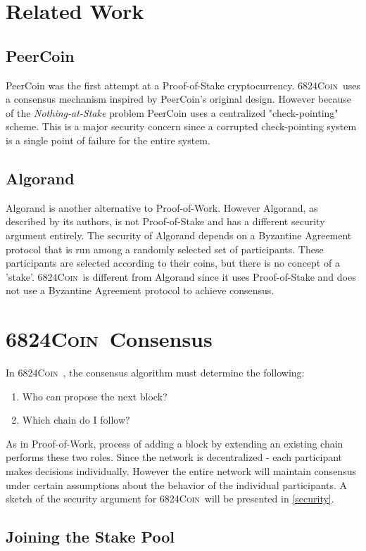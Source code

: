 \documentclass{article}
\newcommand{\coin}{ \textsc{6824Coin}\ }
\begin{document}
\section{Related Work}

\subsection{PeerCoin}
PeerCoin \cite{peercoin} was the first attempt at a Proof-of-Stake cryptocurrency. \coin uses a consensus mechanism inspired by PeerCoin's original design. However because of the \textit{Nothing-at-Stake} problem PeerCoin uses a centralized "check-pointing" scheme. This is a major security concern since a corrupted check-pointing system is a single point of failure for the entire system.  

\subsection{Algorand}
Algorand \cite{algorand} is another alternative to Proof-of-Work. However Algorand, as described by its authors, is not Proof-of-Stake and has a different security argument entirely. The security of Algorand depends on a Byzantine Agreement protocol that is run among a randomly selected set of participants. These participants are selected according to their coins, but there is no concept of a 'stake'. \coin is different from Algorand since it uses Proof-of-Stake and does not use a Byzantine Agreement protocol to achieve consensus.  

\section{\coin Consensus}

In \coin, the consensus algorithm must determine the following:
\begin{enumerate}
\item{Who can propose the next block?}
\item{Which chain do I follow?}
\end{enumerate}
As in Proof-of-Work, process of adding a block by extending an existing chain performs these two roles. Since the network is decentralized - each participant makes decisions individually. However the entire network will maintain consensus under certain assumptions about the behavior of the individual participants. A sketch of the security argument for \coin will be presented in \ref{security}.

\subsection{Joining the Stake Pool}
\end{document}
